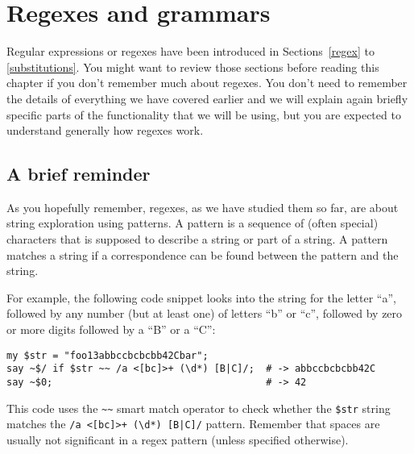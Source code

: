 


\chapter{Regexes and grammars}
\label{regex_grammars}

Regular expressions or regexes have been introduced in
Sections~\ref{regex} to \ref{substitutions}. You might want to review
those sections before reading this chapter if you don't
remember much about regexes. You don't need to remember the details of
everything we have covered earlier and we will explain again briefly
specific parts of the functionality that we will be using, but you are
expected to understand generally how regexes work.

\section{A brief reminder}

As you hopefully remember, regexes, as we have studied 
them so far, are about string exploration using patterns. 
A pattern is a sequence of (often special) characters that 
is supposed to describe a string or part of a string. A 
pattern matches a string if a correspondence can be found 
between the pattern and the string. 

For example, the 
following code snippet looks into the string for the letter 
``a'', followed by any number (but at least one) of letters 
``b'' or ``c'', followed by zero or more digits followed by
a ``B'' or a ``C'':

\begin{verbatim}
my $str = "foo13abbccbcbcbb42Cbar";
say ~$/ if $str ~~ /a <[bc]>+ (\d*) [B|C]/;  # -> abbccbcbcbb42C
say ~$0;                                     # -> 42
\end{verbatim}

This code uses the \verb'~~' smart match operator to 
check whether the \verb'$str' string matches the 
\verb'/a <[bc]>+ (\d*) [B|C]/' pattern. Remember that 
spaces are usually not significant in a regex pattern 
(unless specified otherwise).


